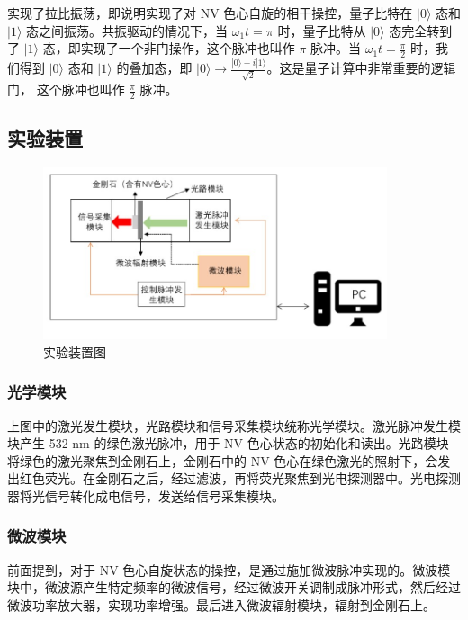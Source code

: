 \documentclass[a4paper,UTF8]{ctexart}
\begin{document}
实现了拉比振荡，即说明实现了对 NV 色心自旋的相干操控，量子比特在 $|0\rangle$ 态和 $|1\rangle$ 态之间振荡。共振驱动的情况下，当 $\omega_1t=\pi$ 时，量子比特从 $|0\rangle$ 态完全转到了 $|1\rangle$ 态，即实现了一个非门操作，这个脉冲也叫作 $\pi$ 脉冲。当 $\omega_1t=\frac\pi2$ 时，我们得到 $|0\rangle$ 态和 $|1\rangle$ 的叠加态，即 $|0\rangle\to\frac{|0\rangle+i|1\rangle}{\sqrt{2}}$。这是量子计算中非常重要的逻辑门， 这个脉冲也叫作 $\frac\pi2$ 脉冲。

\subsection{实验装置}

\begin{figure}[H]
    \centering
    \begin{minipage}[b]{0.9\textwidth}
        \centering
        \includegraphics[width=0.9\textwidth]{./fig7.jpg}
        \caption{实验装置图}
    \end{minipage}
\end{figure}

\subsubsection{光学模块}

上图中的激光发生模块，光路模块和信号采集模块统称光学模块。激光脉冲发生模块产生 532 nm 的绿色激光脉冲，用于 NV 色心状态的初始化和读出。光路模块将绿色的激光聚焦到金刚石上，金刚石中的 NV 色心在绿色激光的照射下，会发出红色荧光。在金刚石之后，经过滤波，再将荧光聚焦到光电探测器中。光电探测器将光信号转化成电信号，发送给信号采集模块。

\subsubsection{微波模块}

前面提到，对于 NV 色心自旋状态的操控，是通过施加微波脉冲实现的。微波模块中，微波源产生特定频率的微波信号，经过微波开关调制成脉冲形式，然后经过微波功率放大器，实现功率增强。最后进入微波辐射模块，辐射到金刚石上。
\end{document}
